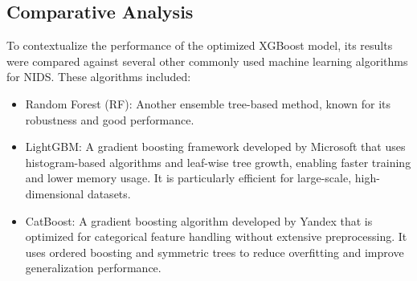 \subsection{Comparative Analysis}
To contextualize the performance of the optimized XGBoost model, its results were compared against several other commonly used machine learning algorithms for NIDS. These algorithms included:
\begin{itemize}
	\item Random Forest (RF): Another ensemble tree-based method, known for its robustness and good performance.
	\item LightGBM: A gradient boosting framework developed by Microsoft that uses histogram-based algorithms and leaf-wise tree growth, enabling faster training and lower memory usage. It is particularly efficient for large-scale, high-dimensional datasets.
	\item CatBoost: A gradient boosting algorithm developed by Yandex that is optimized for categorical feature handling without extensive preprocessing. It uses ordered boosting and symmetric trees to reduce overfitting and improve generalization performance.
\end{itemize}

